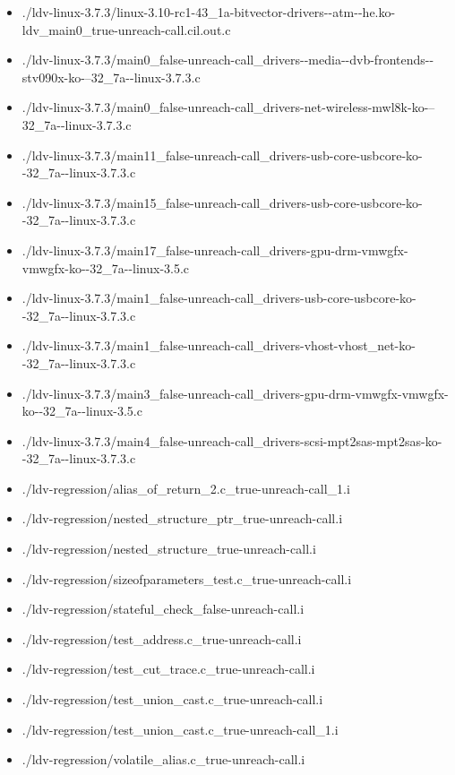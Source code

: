 \documentclass[envcountsame]{llncs}
\begin{document}
\begin{itemize}
\item ./ldv-linux-3.7.3/linux-3.10-rc1-43\_1a-bitvector-drivers-{}-atm-{}-he.ko-ldv\_main0\_true-unreach-call.cil.out.c
\item ./ldv-linux-3.7.3/main0\_false-unreach-call\_drivers-{}-media-{}-dvb-frontends-{}-stv090x-ko-{}--32\_7a-{}-linux-3.7.3.c
\item ./ldv-linux-3.7.3/main0\_false-unreach-call\_drivers-net-wireless-mwl8k-ko-{}--32\_7a-{}-linux-3.7.3.c
\item ./ldv-linux-3.7.3/main11\_false-unreach-call\_drivers-usb-core-usbcore-ko-{}-32\_7a-{}-linux-3.7.3.c
\item ./ldv-linux-3.7.3/main15\_false-unreach-call\_drivers-usb-core-usbcore-ko-{}-32\_7a-{}-linux-3.7.3.c
\item ./ldv-linux-3.7.3/main17\_false-unreach-call\_drivers-gpu-drm-vmwgfx-vmwgfx-ko-{}-32\_7a-{}-linux-3.5.c
\item ./ldv-linux-3.7.3/main1\_false-unreach-call\_drivers-usb-core-usbcore-ko-{}-32\_7a-{}-linux-3.7.3.c
\item ./ldv-linux-3.7.3/main1\_false-unreach-call\_drivers-vhost-vhost\_net-ko-{}-32\_7a-{}-linux-3.7.3.c
\item ./ldv-linux-3.7.3/main3\_false-unreach-call\_drivers-gpu-drm-vmwgfx-vmwgfx-ko-{}-32\_7a-{}-linux-3.5.c
\item ./ldv-linux-3.7.3/main4\_false-unreach-call\_drivers-scsi-mpt2sas-mpt2sas-ko-{}-32\_7a-{}-linux-3.7.3.c


\item ./ldv-regression/alias\_of\_return\_2.c\_true-unreach-call\_1.i
\item ./ldv-regression/nested\_structure\_ptr\_true-unreach-call.i
\item ./ldv-regression/nested\_structure\_true-unreach-call.i
\item ./ldv-regression/sizeofparameters\_test.c\_true-unreach-call.i
\item ./ldv-regression/stateful\_check\_false-unreach-call.i
\item ./ldv-regression/test\_address.c\_true-unreach-call.i
\item ./ldv-regression/test\_cut\_trace.c\_true-unreach-call.i
\item ./ldv-regression/test\_union\_cast.c\_true-unreach-call.i
\item ./ldv-regression/test\_union\_cast.c\_true-unreach-call\_1.i
\item ./ldv-regression/volatile\_alias.c\_true-unreach-call.i



\end{itemize}
\end{document}

